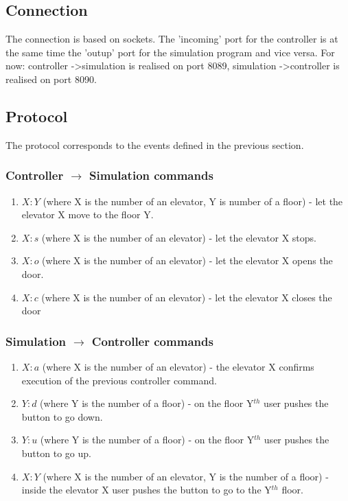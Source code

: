 \documentclass[12pt]{article}
\begin{document}
\subsection{Connection}
The connection is based on sockets. The 'incoming' port for the controller is at the same time the 'outup' port for the simulation program and vice versa.
\newline
\newline
For now:
\newline
controller -\textgreater simulation is realised on port 8089,
\newline
simulation -\textgreater controller is realised on port 8090.

\newpage

\subsection{Protocol}
The protocol corresponds to the events defined in the previous section.

\subsubsection{Controller \(\to\) Simulation commands}
\begin{enumerate}
	\item $X:Y$ (where X is the number of an elevator, Y is number of a floor) - let the elevator X move to the floor Y.
	\item $X:s$ (where X is the number of an elevator) - let the elevator X stops.
	\item $X:o$ (where X is the number of an elevator) - let the elevator X opens the door.
	\item $X:c$ (where X is the number of an elevator) - let the elevator X closes the door
\end{enumerate}


\subsubsection{Simulation \(\to\) Controller commands}
\begin{enumerate}
	\item $X:a$ (where X is the number of an elevator) - the elevator X confirms execution of the previous controller command.
	\item $Y:d$ (where Y is the number of a floor) - on the floor Y$^{th}$ user pushes the button to go down.
	\item $Y:u$ (where Y is the number of a floor) - on the floor Y$^{th}$ user pushes the button to go up.
	\item $X:Y$ (where X is the number of an elevator, Y is the number of a floor) - inside the elevator X user pushes the button to go to the Y$^{th}$ floor.
\end{enumerate}	
\end{document}
